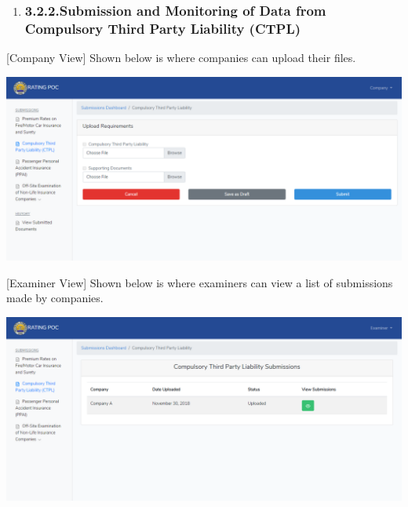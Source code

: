 \documentclass{article}
\begin{document}
\begin{enumerate}[noitemsep,topsep=\mdcompacttopsep]%

\item{}
\subsubsection{3.2.2.\hspace*{0.5em}Submission and Monitoring of Data from Compulsory Third Party Liability (CTPL)}\label{sec-submission-and-monitoring-of-data-from-compulsory-third-party-liability-ctpl}%
\end{enumerate}%

\noindent{}[Company View] Shown below is where companies can
upload their files.%

\includegraphics[keepaspectratio=true]{up-ic-screens/image54}{}%

[Examiner View] Shown below is where examiners can
view a list of submissions made by companies.%

\includegraphics[keepaspectratio=true]{up-ic-screens/image91}{}%
\end{document}
